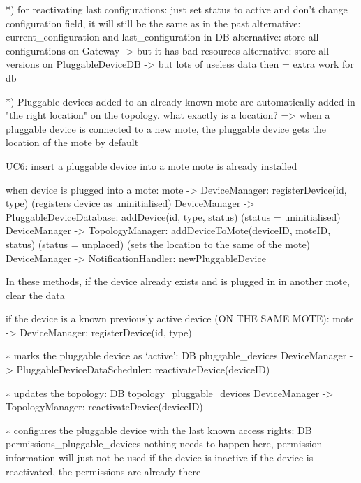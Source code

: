         *) for reactivating last configurations: just set status to active and don't change configuration field, it will still be the same as in the past
            alternative: current_configuration and last_configuration in DB
            alternative: store all configurations on Gateway -> but it has bad resources
            alternative: store all versions on PluggableDeviceDB -> but lots of useless data then = extra work for db

        *) Pluggable devices added to an already known mote are automatically added in "the right location" on the topology.
            what exactly is a location?
            => when a pluggable device is connected to a new mote, the pluggable device gets the location of the mote by default

        UC6: insert a pluggable device into a mote
            mote is already installed

            when device is plugged into a mote:
                mote -> DeviceManager: registerDevice(id, type) (registers device as uninitialised)
                DeviceManager -> PluggableDeviceDatabase: addDevice(id, type, status) (status = uninitialised)
                DeviceManager -> TopologyManager: addDeviceToMote(deviceID, moteID, status) (status = unplaced) (sets the location to the same of the mote)
                DeviceManager -> NotificationHandler: newPluggableDevice

                In these methods, if the device already exists and is plugged in in another mote, clear the data

            if the device is a known previously active device (ON THE SAME MOTE):
                mote -> DeviceManager: registerDevice(id, type)

                ∗ marks the pluggable device as ‘active’: DB pluggable_devices
                    DeviceManager -> PluggableDeviceDataScheduler: reactivateDevice(deviceID)

                ∗ updates the topology: DB topology_pluggable_devices
                    DeviceManager -> TopologyManager: reactivateDevice(deviceID)

                ∗ configures the pluggable device with the last known access rights: DB permissions_pluggable_devices
                    nothing needs to happen here, permission information will just not be used if the device is inactive
                                                  if the device is reactivated, the permissions are already there

